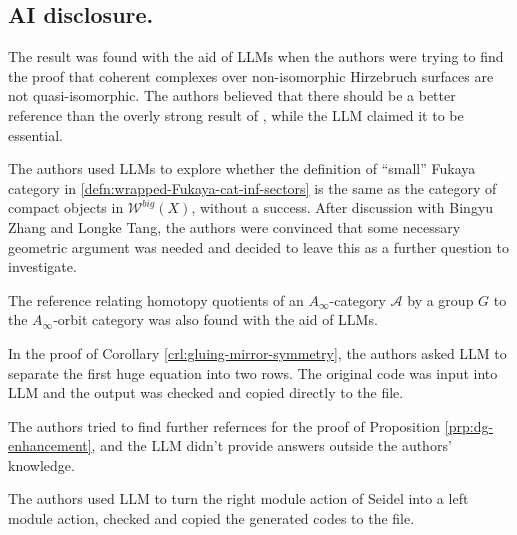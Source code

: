 \subsection*{AI disclosure.} The result \cite{BM01} was found with the aid of LLMs when the authors were trying to find the proof that coherent complexes over non-isomorphic Hirzebruch surfaces are not quasi-isomorphic. The authors believed that there should be a better reference than the overly strong result of \cite{BM01}, while the LLM claimed it to be essential.\par
The authors used LLMs to explore whether the definition of ``small'' Fukaya category in \ref{defn:wrapped-Fukaya-cat-inf-sectors} is the same as the category of compact objects in $\mathcal{W}^{big} (X)$, without a success. After discussion with Bingyu Zhang and Longke Tang, the authors were convinced that some necessary geometric argument was needed and decided to leave this as a further question to investigate.\par
The reference \cite{Christ26} relating homotopy quotients of an $A_{\infty}$-category $\mathcal{A}$ by a group $G$ to the $A_{\infty}$-orbit category was also found with the aid of LLMs.\par
In the proof of Corollary \ref{crl:gluing-mirror-symmetry}, the authors asked LLM to separate the first huge equation into two rows. The original code was input into LLM and the output was checked and copied directly to the file.\par
The authors tried to find further refernces for the proof of Proposition \ref{prp:dg-enhancement}, and the LLM didn't provide answers outside the authors' knowledge.\par
The authors used LLM to turn the right module action of Seidel \cite{Seidel08} into a left module action, checked and copied the generated codes to the file.
